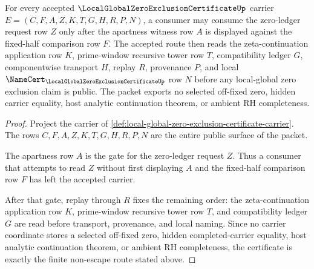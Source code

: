 \begin{theorem}
\label{thm:local-global-zero-exclusion-carrier-certificate}
For every accepted $\LocalGlobalZeroExclusionCertificateUp$ carrier $E=(C,F,A,Z,K,T,G,H,R,P,N)$, a consumer may consume the zero-ledger request row $Z$ only after the apartness witness row $A$ is displayed against the fixed-half comparison row $F$. The accepted route then reads the zeta-continuation application row $K$, prime-window recursive tower row $T$, compatibility ledger $G$, componentwise transport $H$, replay $R$, provenance $P$, and local $\NameCert_{\LocalGlobalZeroExclusionCertificateUp}$ row $N$ before any local-global zero exclusion claim is public. The packet exports no selected off-fixed zero, hidden carrier equality, host analytic continuation theorem, or ambient RH completeness.
\end{theorem}
\begin{proof}
Project the carrier of \autoref{def:local-global-zero-exclusion-certificate-carrier}. The rows $C,F,A,Z,K,T,G,H,R,P,N$ are the entire public surface of the packet.

The apartness row $A$ is the gate for the zero-ledger request $Z$. Thus a consumer that attempts to read $Z$ without first displaying $A$ and the fixed-half comparison row $F$ has left the accepted carrier.

After that gate, replay through $R$ fixes the remaining order: the zeta-continuation application row $K$, prime-window recursive tower row $T$, and compatibility ledger $G$ are read before transport, provenance, and local naming. Since no carrier coordinate stores a selected off-fixed zero, hidden completed-carrier equality, host analytic continuation theorem, or ambient RH completeness, the certificate is exactly the finite non-escape route stated above.
\end{proof}



